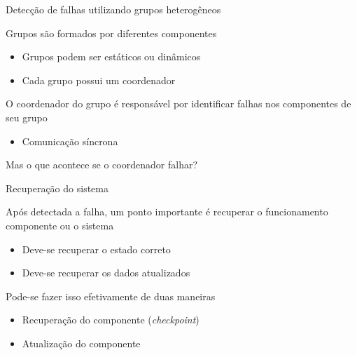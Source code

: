 \documentclass[compress]{beamer}
\begin{document}

\begin{frame}{Detecção de falhas utilizando grupos heterogêneos}

Grupos são formados por diferentes componentes
\begin{itemize}
    \item Grupos podem ser estáticos ou dinâmicos
    \item Cada grupo possui um coordenador
\end{itemize}

\vspace{0.5cm}

O coordenador do grupo é responsável por identificar falhas nos componentes de seu grupo
\begin{itemize}
    \item Comunicação síncrona
\end{itemize}

\vspace{0.5cm}

Mas o que acontece se o coordenador falhar?
\end{frame}


\begin{frame}{Recuperação do sistema}

Após detectada a falha, um ponto importante é recuperar o funcionamento componente ou o sistema
\begin{itemize}
    \item Deve-se recuperar o estado correto
    \item Deve-se recuperar os dados atualizados
\end{itemize}

\vspace{0.5cm}

Pode-se fazer isso efetivamente de duas maneiras
\begin{itemize}
    \item Recuperação do componente (\textit{checkpoint})
    \item Atualização do componente
\end{itemize}
\end{frame}

\end{document}
